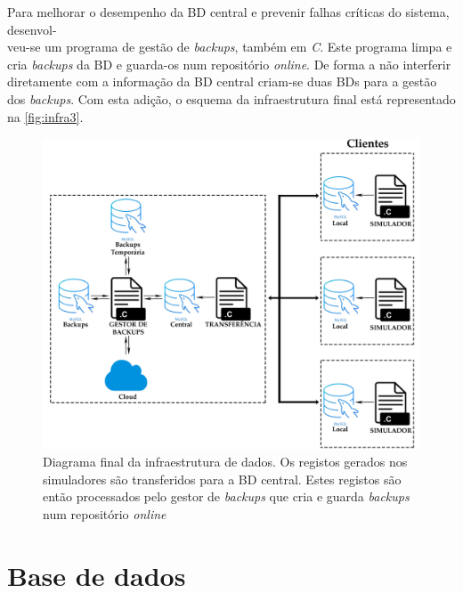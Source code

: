 \documentclass[11pt,twoside,a4paper]{report}
\begin{document}
Para melhorar o desempenho da BD central e prevenir falhas críticas do sistema, desenvol-\\veu-se um programa de gestão de \textit{backups}, também em \textit{C}. Este programa limpa e cria \textit{backups} da BD e guarda-os num repositório \textit{online}. De forma a não interferir diretamente com a informação da BD central criam-se duas BDs para a gestão dos \textit{backups}. Com esta adição, o esquema da infraestrutura final está representado na \autoref{fig:infra3}.\par 
\begin{figure}
	\begin{center}
		\includegraphics[width=1\textwidth]{Esquema_Projeto_8} %
		\caption[Diagrama final da infraestrutura]{Diagrama final da infraestrutura de dados. Os registos gerados nos simuladores são transferidos para a BD central. Estes registos são então processados pelo gestor de \textit{backups} que cria e guarda \textit{backups} num repositório \textit{online}}
		\label{fig:infra3}
		\end{center}
\end{figure}

\section{Base de dados}
\end{document}
